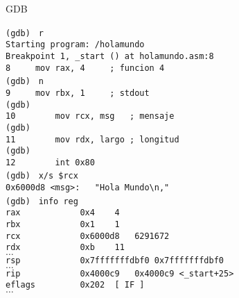 \documentclass[aspectratio=169]{beamer}
\begin{document}
\begin{frame}[fragile,t]{GDB}
    \hspace{3cm}
    \begin{minipage}{10cm}
    \vspace{-0.5cm}
    \scriptsize
    \verb|(gdb) | \pause \verb|r|\\
    \verb|Starting program: /holamundo |\\
    \verb|Breakpoint 1, _start () at holamundo.asm:8   |\\
    \verb|8	    mov rax, 4     ; funcion 4             |\\
    \verb|(gdb) | \verb|n|\\ 
    \verb|9	    mov rbx, 1     ; stdout                |\\
    \verb|(gdb) | \\ 
    \verb|10	    mov rcx, msg   ; mensaje           |\\
    \verb|(gdb) |\\ 
    \verb|11	    mov rdx, largo ; longitud          |\\
    \verb|(gdb) |\\ 
    \verb|12	    int 0x80                           |\\
    \verb|(gdb) | \pause \verb|x/s $rcx|\\ \pause
    \verb|0x6000d8 <msg>:	"Hola Mundo\n,"|\\
    \verb|(gdb) | \pause \verb|info reg|\\ \pause
    \verb|rax            0x4	4|\\
    \verb|rbx            0x1	1|\\
    \verb|rcx            0x6000d8	6291672|\\
    \verb|rdx            0xb	11|\\
    \vspace{-0.1cm}
    $\dots$\\
    \vspace{0.1cm}
    \verb|rsp            0x7fffffffdbf0	0x7fffffffdbf0|\\
    \vspace{-0.1cm}
    $\dots$\\
    \vspace{0.1cm}
    \verb|rip            0x4000c9	0x4000c9 <_start+25>|\\
    \verb|eflags         0x202	[ IF ]|\\
    \vspace{-0.1cm}
    $\dots$\\
    \vspace{0.1cm}
    \end{minipage}
\end{frame}
\end{document}
